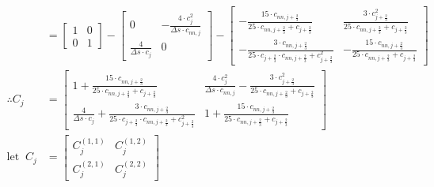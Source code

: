 \documentclass{article}
\begin{document}
\begin{align*}
	                    & = \begin{bmatrix} 1 & 0 \\ 0 & 1 \end{bmatrix} - \begin{bmatrix} 0 & -\frac{4\cdot c^2_j}{\Delta s\cdot c_{nn, j}}  \\ \frac{4}{\Delta s\cdot c_j} & 0\end{bmatrix} - \begin{bmatrix} -\frac{15\cdot c_{nn, j+\frac{2}{3}}}{25\cdot c_{nn, j+\frac{2}{3}} + c_{j+\frac{2}{3}}} & \frac{3\cdot c^2_{j+\frac{2}{3}}}{25\cdot c_{nn, j+\frac{2}{3}} + c_{j+\frac{2}{3}}}  \\ -\frac{3\cdot c_{nn, j+\frac{2}{3}}}{25\cdot c_{j+\frac{2}{3}}\cdot c_{nn, j+\frac{2}{3}} + c_{j+\frac{2}{3}}^2} & -\frac{15\cdot c_{nn, j+\frac{2}{3}}}{25\cdot c_{nn, j+\frac{2}{3}} + c_{j+\frac{2}{3}}} \end{bmatrix} \\
	\therefore C_j      & = \begin{bmatrix} 1 + \frac{15\cdot c_{nn, j+\frac{2}{3}}}{25\cdot c_{nn, j+\frac{2}{3}} + c_{j+\frac{2}{3}}} & \frac{4\cdot c^2_j}{\Delta s\cdot c_{nn, j}} - \frac{3\cdot c^2_{j+\frac{2}{3}}}{25\cdot c_{nn, j+\frac{2}{3}} + c_{j+\frac{2}{3}}} \\ \frac{4}{\Delta s\cdot c_j} + \frac{3\cdot c_{nn, j+\frac{2}{3}}}{25\cdot c_{j+\frac{2}{3}}\cdot c_{nn, j+\frac{2}{3}} + c_{j+\frac{2}{3}}^2} & 1 + \frac{15\cdot c_{nn, j+\frac{2}{3}}}{25\cdot c_{nn, j+\frac{2}{3}} + c_{j+\frac{2}{3}}}\end{bmatrix}                                                                                     \\
	\mathrm{let\;\;}C_j & = \begin{bmatrix} C^{(1, 1)}_{j} & C^{(1, 2)}_{j} \\ C^{(2, 1)}_{j} & C^{(2, 2)}_{j} \end{bmatrix}                                                                                                                                                                                                                                                                                                                                                                                                                                                                                                                                                                                                                                                                    \\

\end{align*}
\end{document}
